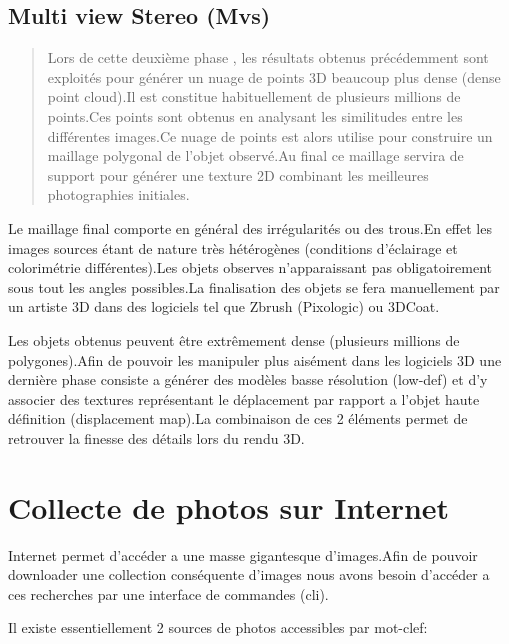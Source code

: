 \documentclass[a4paper,10pt,french]{sphinxhowto}
\begin{document}
\subsection{\textbf{Multi view Stereo (Mvs)}}
\label{introduction:multi-view-stereo-mvs}\begin{quote}

Lors de cette deuxième phase , les résultats obtenus précédemment sont exploités pour générer un nuage de points 3D beaucoup plus dense (dense point cloud).Il est constitue habituellement de plusieurs millions de points.Ces points sont obtenus en analysant les similitudes entre les différentes images.Ce nuage de points est alors utilise pour construire un maillage polygonal de l'objet observé.Au final ce maillage servira de support pour générer une texture 2D combinant les meilleures photographies initiales.
\end{quote}

Le maillage final comporte en général des irrégularités ou des trous.En effet les images sources étant de nature très hétérogènes (conditions d’éclairage et colorimétrie différentes).Les objets observes n'apparaissant pas obligatoirement sous tout les angles possibles.La finalisation des objets se fera manuellement par un artiste 3D dans des logiciels tel que Zbrush (Pixologic) ou 3DCoat.

Les objets obtenus peuvent être extrêmement dense (plusieurs millions de polygones).Afin de pouvoir les manipuler plus aisément dans les logiciels 3D une dernière phase consiste a générer des modèles basse résolution (low-def) et d'y associer des textures représentant le déplacement par rapport a l'objet haute définition (displacement map).La combinaison de ces 2 éléments permet de retrouver la finesse des détails lors du rendu 3D.


\section{Collecte de photos sur Internet}
\label{collection:collecte-de-photos-sur-internet}\label{collection::doc}
Internet permet d’accéder a une masse gigantesque d'images.Afin de pouvoir downloader une collection conséquente d'images nous avons besoin d’accéder a ces recherches par une interface de commandes (cli).

Il existe essentiellement 2 sources de photos accessibles par mot-clef:
\end{document}
